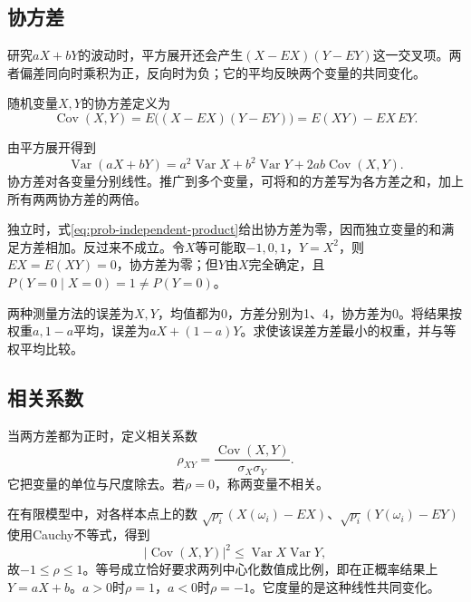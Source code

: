 \subsection{协方差}

研究\(aX+bY\)的波动时，平方展开还会产生\((X-EX)(Y-EY)\)这一交叉项。两者偏差同向时乘积为正，反向时为负；它的平均反映两个变量的共同变化。

\begin{definition}
随机变量\(X,Y\)的{\heiti 协方差}定义为
\[
 \operatorname{Cov}(X,Y)=E\bigl((X-EX)(Y-EY)\bigr)
 =E(XY)-EX\,EY.
\]
\end{definition}

由平方展开得到
\begin{equation}\label{eq:prob-sum-variance}
 \operatorname{Var}(aX+bY)=a^2\operatorname{Var}X+b^2\operatorname{Var}Y
 +2ab\operatorname{Cov}(X,Y).
\end{equation}
协方差对各变量分别线性。推广到多个变量，可将和的方差写为各方差之和，加上所有两两协方差的两倍。

独立时，式\eqref{eq:prob-independent-product}给出协方差为零，因而独立变量的和满足方差相加。反过来不成立。令\(X\)等可能取\(-1,0,1\)，\(Y=X^2\)，则\(EX=E(XY)=0\)，协方差为零；但\(Y\)由\(X\)完全确定，且\(P(Y=0\mid X=0)=1\ne P(Y=0)\)。

\begin{example}
两种测量方法的误差为\(X,Y\)，均值都为0，方差分别为1、4，协方差为0。将结果按权重\(a,1-a\)平均，误差为\(aX+(1-a)Y\)。求使该误差方差最小的权重，并与等权平均比较。
\end{example}

\subsection{相关系数}

当两方差都为正时，定义{\heiti 相关系数}
\begin{equation}\label{eq:prob-correlation}
 \rho_{XY}=\frac{\operatorname{Cov}(X,Y)}{\sigma_X\sigma_Y}.
\end{equation}
它把变量的单位与尺度除去。若\(\rho=0\)，称两变量{\heiti 不相关}。

在有限模型中，对各样本点上的数
\(\sqrt{p_i}(X(\omega_i)-EX)\)、\(\sqrt{p_i}(Y(\omega_i)-EY)\)使用Cauchy不等式，得到
\[
 |\operatorname{Cov}(X,Y)|^2\le\operatorname{Var}X\operatorname{Var}Y,
\]
故\(-1\le\rho\le1\)。等号成立恰好要求两列中心化数值成比例，即在正概率结果上\(Y=aX+b\)。\(a>0\)时\(\rho=1\)，\(a<0\)时\(\rho=-1\)。它度量的是这种线性共同变化。

